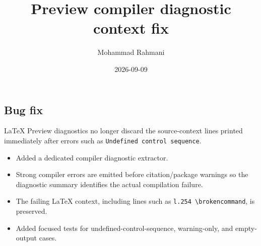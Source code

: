 \documentclass[a4paper]{article}
\title{Preview compiler diagnostic context fix}
\date{2026-09-09}
\author{Mohammad Rahmani}
\begin{document}
   \maketitle

   \begin{preview}
      \section*{Bug fix}
      LaTeX Preview diagnostics no longer discard the source-context lines printed
      immediately after errors such as \texttt{Undefined control sequence}.

      \begin{itemize}
         \item Added a dedicated compiler diagnostic extractor.
         \item Strong compiler errors are emitted before citation/package warnings so
         the diagnostic summary identifies the actual compilation failure.
         \item The failing LaTeX context, including lines such as
         \texttt{l.254 \textbackslash brokencommand}, is preserved.
         \item Added focused tests for undefined-control-sequence, warning-only, and
         empty-output cases.
      \end{itemize}
   \end{preview}

   
   
\end{document}
